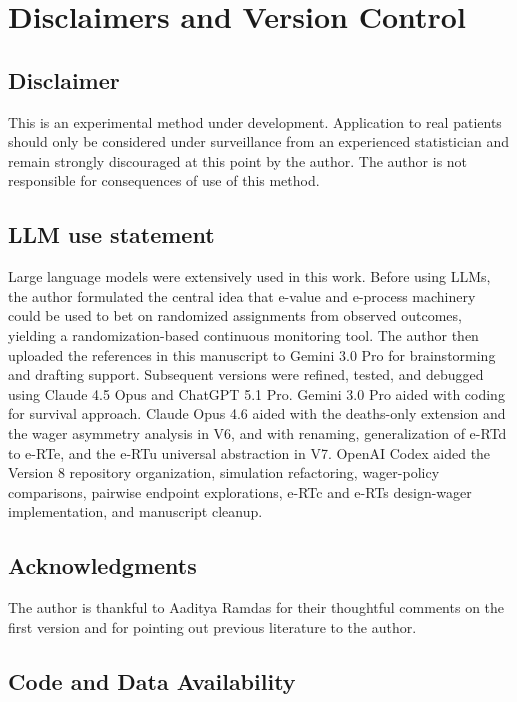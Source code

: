 \documentclass[10pt]{article}
\begin{document}
\section{Disclaimers and Version Control}

\subsection{Disclaimer}

This is an experimental method under development. Application to real patients should only be considered under surveillance from an experienced statistician and remain strongly discouraged at this point by the author. The author is not responsible for consequences of use of this method.

\subsection{LLM use statement}

Large language models were extensively used in this work. Before using LLMs, the author formulated the central idea that e-value and e-process machinery could be used to bet on randomized assignments from observed outcomes, yielding a randomization-based continuous monitoring tool. The author then uploaded the references in this manuscript to Gemini 3.0 Pro for brainstorming and drafting support. Subsequent versions were refined, tested, and debugged using Claude 4.5 Opus and ChatGPT 5.1 Pro. Gemini 3.0 Pro aided with coding for survival approach. Claude Opus 4.6 aided with the deaths-only extension and the wager asymmetry analysis in V6, and with renaming, generalization of e-RTd to e-RTe, and the e-RTu universal abstraction in V7. OpenAI Codex aided the Version 8 repository organization, simulation refactoring, wager-policy comparisons, pairwise endpoint explorations, e-RTc and e-RTs design-wager implementation, and manuscript cleanup.

\subsection{Acknowledgments}

The author is thankful to Aaditya Ramdas for their thoughtful comments on the first version and for pointing out previous literature to the author.

\subsection{Code and Data Availability}
\end{document}
